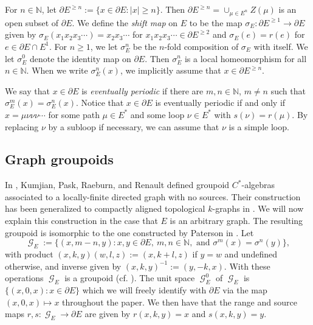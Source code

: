 \documentclass[12pt, a4paper]{amsart}
\numberwithin{equation}{section}
\theoremstyle{definition}
\theoremstyle{remark}
\begin{document}
For $n\in{\mathbb{N}}$, let $\partial E^{\ge n}:=\{x\in\partial E: |x|\ge n\}$. Then $\partial E^{\ge n}= \cup_{\mu \in E^n} Z(\mu)$ is an open subset of $\partial E$. We define the \emph{shift map} on $E$ to be the map $\sigma_E:\partial E^{\ge 1}\to\partial E$ given by $\sigma_E(x_1x_2x_3\cdots)=x_2x_3\cdots$ for $x_1x_2x_3\cdots\in\partial E^{\ge 2}$ and $\sigma_E(e)=r(e)$ for $e\in\partial E\cap E^1$. For $n\ge 1$, we let $\sigma_E^n$ be the $n$-fold composition of $\sigma_E$ with itself. We let $\sigma_E^0$ denote the identity map on $\partial E$. Then $\sigma_E^n$ is a local homeomorphism for all $n\in{\mathbb{N}}$. When we write $\sigma_E^n(x)$, we implicitly assume that $x\in\partial E^{\ge n}$.  

We say that $x\in\partial E$ is \emph{eventually periodic} if there are $m,n\in{\mathbb{N}}$, $m\ne n$ such that $\sigma_E^m(x)=\sigma_E^n(x)$. Notice that $x\in\partial E$ is eventually periodic if and only if $x=\mu\nu\nu\nu\cdots$ for some path $\mu\in E^*$ and some loop $\nu\in E^*$ with $s(\nu)=r(\mu)$. By replacing $\nu$ by a subloop if necessary, we can assume that $\nu$ is a simple loop.

\subsection{Graph groupoids}

In \cite{KPRR}, Kumjian, Pask, Raeburn, and Renault defined groupoid $C^*$-algebras associated to a locally-finite directed graph with no sources. Their construction has been generalized to compactly aligned topological $k$-graphs in \cite{Yee}. We will now explain this construction in the case that $E$ is an arbitrary graph. The resulting groupoid is isomorphic to the one constructed by Paterson in \cite{Pat}. Let  
\begin{equation*}
	{\operatorname{\mathcal{G}}}_E:=\{(x,m-n,y): x,y\in\partial E,\ m,n\in{\mathbb{N}},\text{ and } \sigma^m(x)=\sigma^n(y)\},
\end{equation*}
with product $(x,k,y)(w,l,z):=(x,k+l,z)$ if $y=w$ and undefined otherwise, and inverse given by $(x,k,y)^{-1}:=(y,-k,x)$.
With these operations ${\operatorname{\mathcal{G}}}_E$ is a groupoid (cf. \cite[Lemma 2.4]{KPRR}). The unit space ${\operatorname{\mathcal{G}}}_E^0$ of ${\operatorname{\mathcal{G}}}_E$ is $\{(x,0,x):x\in\partial E\}$ which we will freely identify with $\partial E$ via the map $(x,0,x)\mapsto x$ throughout the paper. We then have that the range and source maps $r,s: {\operatorname{\mathcal{G}}}_E \to \partial E$ are given by $r(x,k,y)=x$ and $s(x,k,y)=y$.
\end{document}
